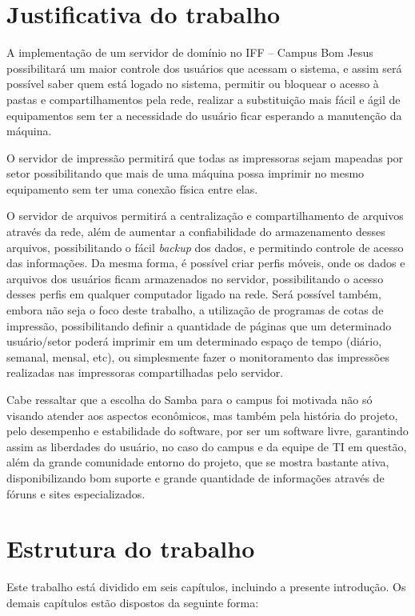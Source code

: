 \section{Justificativa do trabalho}

A implementação de um servidor de domínio no IFF – Campus Bom Jesus possibilitará um maior controle dos usuários que acessam o sistema, e assim será possível saber quem está logado no sistema, permitir ou bloquear o acesso à pastas e compartilhamentos pela rede, realizar a substituição mais fácil e ágil de equipamentos sem ter a necessidade do usuário ficar esperando a manutenção da máquina.

O servidor de impressão permitirá que todas as impressoras sejam mapeadas por setor possibilitando que mais de uma máquina possa imprimir no mesmo equipamento sem ter uma conexão física entre elas.

O servidor de arquivos permitirá a centralização e compartilhamento de arquivos através da rede, além de aumentar a confiabilidade do armazenamento desses arquivos, possibilitando o fácil \textit{backup} dos dados, e permitindo controle de acesso das informações. Da mesma forma, é possível criar perfis móveis, onde os dados e arquivos dos usuários ficam armazenados no servidor, possibilitando o acesso desses perfis em qualquer computador ligado na rede. Será possível também, embora não seja o foco deste trabalho, a utilização de programas de cotas de impressão, possibilitando definir a quantidade de páginas que um determinado usuário/setor poderá imprimir em um determinado espaço de tempo (diário, semanal, mensal, etc), ou simplesmente fazer o monitoramento das impressões realizadas nas impressoras compartilhadas pelo servidor.

Cabe ressaltar que a escolha do Samba para o campus foi motivada não só visando atender aos aspectos econômicos, mas também pela história do projeto, pelo desempenho e estabilidade do software, por ser um software livre, garantindo assim as liberdades do usuário, no caso do campus e da equipe de TI em questão, além da grande comunidade entorno do projeto, que se mostra bastante ativa, disponibilizando bom suporte e grande quantidade de informações através de fóruns e sites especializados.

\section{Estrutura do trabalho}

Este trabalho está dividido em seis capítulos, incluindo a presente introdução. Os demais capítulos estão dispostos da seguinte forma:

